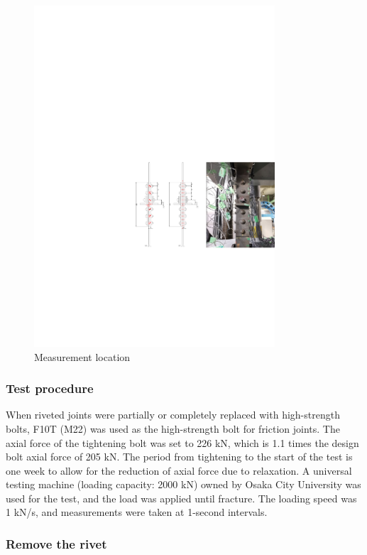 \begin{figure}[htbp]
    \centering
    \includegraphics[width=0.8\textwidth]{imgs/ch3/ch3mealoc.pdf}
    \caption{Measurement location}
    \label{fig-ch3mealoc}
\end{figure}

\subsubsection{Test procedure}

When riveted joints were partially or completely replaced with high-strength bolts, F10T (M22) was used as the high-strength bolt for friction joints. The axial force of the tightening bolt was set to 226 kN, which is 1.1 times the design bolt axial force of 205 kN. The period from tightening to the start of the test is one week to allow for the reduction of axial force due to relaxation. A universal testing machine (loading capacity: 2000 kN) owned by Osaka City University was used for the test, and the load was applied until fracture. The loading speed was 1 kN/s, and measurements were taken at 1-second intervals.

\subsubsection{Remove the rivet}

